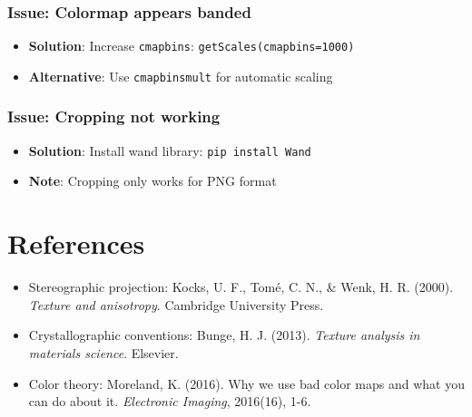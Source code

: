 \documentclass[11pt,a4paper]{article}
\begin{document}
\subsubsection{Issue: Colormap appears banded}
\begin{itemize}[leftmargin=*]
    \item \textbf{Solution}: Increase \texttt{cmapbins}: \texttt{getScales(cmapbins=1000)}
    \item \textbf{Alternative}: Use \texttt{cmapbinsmult} for automatic scaling
\end{itemize}

\subsubsection{Issue: Cropping not working}
\begin{itemize}[leftmargin=*]
    \item \textbf{Solution}: Install wand library: \texttt{pip install Wand}
    \item \textbf{Note}: Cropping only works for PNG format
\end{itemize}

\section{References}

\begin{itemize}[leftmargin=*]
    \item Stereographic projection: Kocks, U. F., Tomé, C. N., \& Wenk, H. R. (2000). \textit{Texture and anisotropy}. Cambridge University Press.
    \item Crystallographic conventions: Bunge, H. J. (2013). \textit{Texture analysis in materials science}. Elsevier.
    \item Color theory: Moreland, K. (2016). Why we use bad color maps and what you can do about it. \textit{Electronic Imaging}, 2016(16), 1-6.
\end{itemize}
\end{document}
